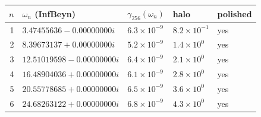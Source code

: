 \begin{tabular}{rllll}
\toprule
$n$ & $\omega_n$ (InfBeyn) & $\gamma_{256}(\omega_n)$ & halo & polished\\
\midrule
1 & $3.47455636-0.00000000i$ & $6.3\times10^{-9}$ & $8.2\times10^{-1}$ & yes\\
2 & $8.39673137+0.00000000i$ & $5.2\times10^{-9}$ & $1.4\times10^{0}$ & yes\\
3 & $12.51019598-0.00000000i$ & $6.4\times10^{-9}$ & $2.1\times10^{0}$ & yes\\
4 & $16.48904036+0.00000000i$ & $6.1\times10^{-9}$ & $2.8\times10^{0}$ & yes\\
5 & $20.55778685+0.00000000i$ & $6.5\times10^{-9}$ & $3.6\times10^{0}$ & yes\\
6 & $24.68263122+0.00000000i$ & $6.8\times10^{-9}$ & $4.3\times10^{0}$ & yes\\
\bottomrule
\end{tabular}
